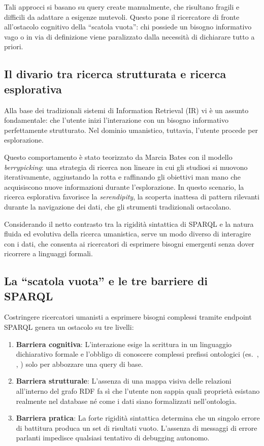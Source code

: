 Tali approcci si basano su query create manualmente, che risultano fragili e difficili da adattare a esigenze mutevoli\cite{Mar25}. Questo pone il ricercatore di fronte all'ostacolo cognitivo della ``scatola vuota'': chi possiede un bisogno informativo vago o in via di definizione viene paralizzato dalla necessità di dichiarare tutto a priori.

\subsection{Il divario tra ricerca strutturata e ricerca esplorativa}\label{subsec:berrypicking}

Alla base dei tradizionali sistemi di Information Retrieval (IR) vi è un assunto fondamentale: che l'utente inizi l'interazione con un bisogno informativo perfettamente strutturato.
Nel dominio umanistico, tuttavia, l'utente procede per esplorazione.

Questo comportamento è stato teorizzato da Marcia Bates con il modello \textit{berrypicking}\cite{Bat89}: una strategia di ricerca non lineare in cui gli studiosi si muovono iterativamente, aggiustando la rotta e raffinando gli obiettivi man mano che acquisiscono nuove informazioni durante l'esplorazione.
In questo scenario, la ricerca esplorativa favorisce la \textit{serendipity}, la scoperta inattesa di pattern rilevanti durante la navigazione dei dati, che gli strumenti tradizionali ostacolano.

Considerando il netto contrasto tra la rigidità sintattica di SPARQL e la natura fluida ed evolutiva della ricerca umanistica, serve un modo diverso di interagire con i dati, che consenta ai ricercatori di esprimere bisogni emergenti senza dover ricorrere a linguaggi formali.

\subsection{La ``scatola vuota'' e le tre barriere di SPARQL}\label{subsec:tre_barriere}

Costringere ricercatori umanisti a esprimere bisogni complessi tramite endpoint SPARQL genera un ostacolo su tre livelli:

\begin{enumerate}
    \item \textbf{Barriera cognitiva}: L'interazione esige la scrittura in un linguaggio dichiarativo formale e l'obbligo di conoscere complessi prefissi ontologici (es.\ , , ) solo per abbozzare una query di base.
    \item \textbf{Barriera strutturale}: L'assenza di una mappa visiva delle relazioni all'interno del grafo RDF fa sì che l'utente non sappia quali proprietà esistano realmente nel database né come i dati siano formalizzati nell'ontologia.
    \item \textbf{Barriera pratica}: La forte rigidità sintattica determina che un singolo errore di battitura produca un set di risultati vuoto. L'assenza di messaggi di errore parlanti impedisce qualsiasi tentativo di debugging autonomo.
\end{enumerate}

